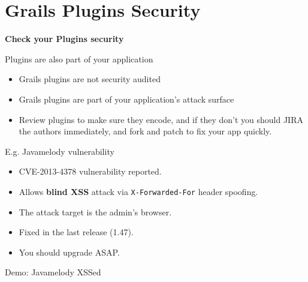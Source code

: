 
\section{Grails Plugins Security}

\begin{frame}[plain]
    \begin{center}
      \Huge\bfseries
      Check your Plugins security
    \end{center}
\end{frame}

\begin{frame}[plain]{Plugins are also part of your application}
  \begin{itemize}[<+-| alert@+>]
    \item Grails plugins are not security audited
    \item Grails plugins are part of your application's attack surface
    \item Review plugins to make sure they encode, and if they don't you should JIRA the authors immediately, and fork and patch to fix your app quickly.
  \end{itemize}
\end{frame}

\begin{frame}{E.g. Javamelody vulnerability}
  \begin{itemize}[<+-| alert@+>]
    \item CVE-2013-4378 vulnerability reported.
    \item Allows \textbf{blind XSS} attack via \verb|X-Forwarded-For| header spoofing.
    \item The attack target is the admin's browser.
    \item Fixed in the last release (1.47).
    \item You should upgrade ASAP.
  \end{itemize}
\end{frame}

\begin{frame}{Demo: Javamelody XSSed}
  \begin{center}
  \end{center}
\end{frame}
